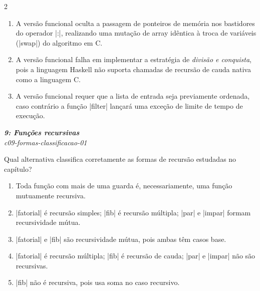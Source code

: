 \documentclass[a4paper,10pt,brazil]{article}
\begin{document}
\begin{multicols}{2}
\begin{enumerate}
  \item A versão funcional oculta a passagem de ponteiros de memória nos bastidores do operador \haskellinline|:|, realizando uma mutação de array idêntica à troca de variáveis (\cinline|swap|) do algoritmo em C.

  \item A versão funcional falha em implementar a estratégia de \emph{divisão e conquista}, pois a linguagem Haskell não suporta chamadas de recursão de cauda nativa como a linguagem C.

  \item A versão funcional requer que a lista de entrada seja previamente ordenada, caso contrário a função \haskellinline|filter| lançará uma exceção de limite de tempo de execução.


\end{enumerate}

\begin{flushright}
  \footnotesize
  \textit{\textbf{9: Funções recursivas}}\\
  \textit{c09-formas-classificacao-01}\\

\end{flushright}
Qual alternativa classifica corretamente as formas de recursão estudadas no capítulo?

\begin{enumerate}
  \item Toda função com mais de uma guarda é, necessariamente, uma função mutuamente recursiva.

  \item \haskellinline|fatorial| é recursão simples; \haskellinline|fib| é recursão múltipla; \haskellinline|par| e \haskellinline|impar| formam recursividade mútua.

  \item \haskellinline|fatorial| e \haskellinline|fib| são recursividade mútua, pois ambas têm casos base.

  \item \haskellinline|fatorial| é recursão múltipla; \haskellinline|fib| é recursão de cauda; \haskellinline|par| e \haskellinline|impar| não são recursivas.

  \item \haskellinline|fib| não é recursiva, pois usa soma no caso recursivo.


\end{enumerate}


\end{multicols}
\end{document}
